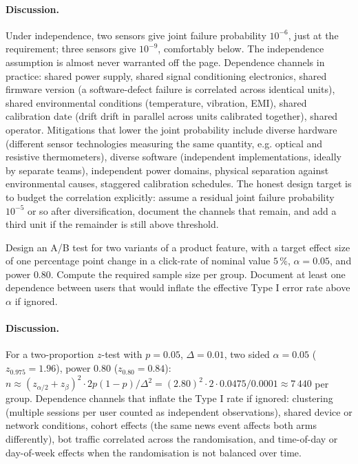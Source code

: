 \paragraph{Discussion.}
Under independence, two sensors give joint failure probability
$10^{-6}$, just at the requirement; three sensors give $10^{-9}$,
comfortably below. The independence assumption is almost never
warranted off the page. Dependence channels in practice: shared
power supply, shared signal conditioning electronics, shared
firmware version (a software-defect failure is correlated across
identical units), shared environmental conditions (temperature,
vibration, EMI), shared calibration date (drift drift in parallel
across units calibrated together), shared operator. Mitigations
that lower the joint probability include diverse hardware
(different sensor technologies measuring the same quantity, e.g.
optical and resistive thermometers), diverse software (independent
implementations, ideally by separate teams), independent power
domains, physical separation against environmental causes, staggered
calibration schedules. The honest design target is to budget the
correlation explicitly: assume a residual joint failure probability
$10^{-5}$ or so after diversification, document the channels that
remain, and add a third unit if the remainder is still above
threshold.

\begin{exercise}
Design an A/B test for two variants of a product feature, with a
target effect size of one percentage point change in a click-rate
of nominal value $5\,\%$, $\alpha = 0.05$, and power $0.80$.
Compute the required sample size per group. Document at least one
dependence between users that would inflate the effective Type I
error rate above $\alpha$ if ignored.
\end{exercise}

\paragraph{Discussion.}
For a two-proportion $z$-test with $p = 0.05$, $\Delta = 0.01$, two
sided $\alpha = 0.05$ ($z_{0.975} = 1.96$), power $0.80$
($z_{0.80} = 0.84$): $n \approx (z_{\alpha/2} + z_{\beta})^{2}
\cdot 2 p(1 - p)/\Delta^{2} = (2.80)^{2} \cdot 2 \cdot 0.0475 /
0.0001 \approx 7\,440$ per group. Dependence channels that inflate
the Type I rate if ignored: clustering (multiple sessions per
user counted as independent observations), shared device or
network conditions, cohort effects (the same news event affects
both arms differently), bot traffic correlated across the
randomisation, and time-of-day or day-of-week effects when the
randomisation is not balanced over time.

